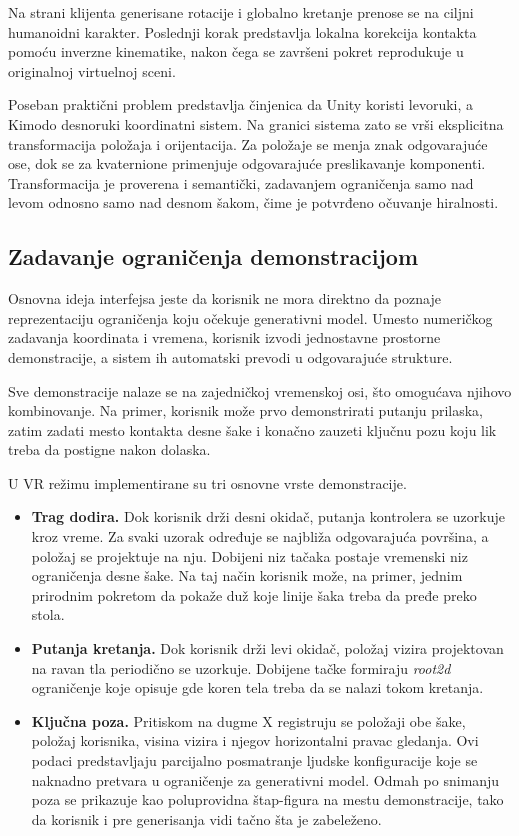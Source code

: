 \documentclass{article}
\begin{document}
Na strani klijenta generisane rotacije i globalno kretanje prenose se na ciljni humanoidni karakter. Poslednji korak predstavlja lokalna korekcija kontakta pomoću inverzne kinematike, nakon čega se završeni pokret reprodukuje u originalnoj virtuelnoj sceni.

Poseban praktični problem predstavlja činjenica da Unity koristi levoruki, a Kimodo desnoruki koordinatni sistem. Na granici sistema zato se vrši eksplicitna transformacija položaja i orijentacija. Za položaje se menja znak odgovarajuće ose, dok se za kvaternione primenjuje odgovarajuće preslikavanje komponenti. Transformacija je proverena i semantički, zadavanjem ograničenja samo nad levom odnosno samo nad desnom šakom, čime je potvrđeno očuvanje hiralnosti.

\subsection{Zadavanje ograničenja demonstracijom}
\label{sec:interactions}

Osnovna ideja interfejsa jeste da korisnik ne mora direktno da poznaje reprezentaciju ograničenja koju očekuje generativni model. Umesto numeričkog zadavanja koordinata i vremena, korisnik izvodi jednostavne prostorne demonstracije, a sistem ih automatski prevodi u odgovarajuće strukture.

Sve demonstracije nalaze se na zajedničkoj vremenskoj osi, što omogućava njihovo kombinovanje. Na primer, korisnik može prvo demonstrirati putanju prilaska, zatim zadati mesto kontakta desne šake i konačno zauzeti ključnu pozu koju lik treba da postigne nakon dolaska.

U VR režimu implementirane su tri osnovne vrste demonstracije.

\begin{itemize}
    \item \textbf{Trag dodira.} Dok korisnik drži desni okidač, putanja kontrolera se uzorkuje kroz vreme. Za svaki uzorak određuje se najbliža odgovarajuća površina, a položaj se projektuje na nju. Dobijeni niz tačaka postaje vremenski niz ograničenja desne šake. Na taj način korisnik može, na primer, jednim prirodnim pokretom da pokaže duž koje linije šaka treba da pređe preko stola.

    \item \textbf{Putanja kretanja.} Dok korisnik drži levi okidač, položaj vizira projektovan na ravan tla periodično se uzorkuje. Dobijene tačke formiraju \textit{root2d} ograničenje koje opisuje gde koren tela treba da se nalazi tokom kretanja.

    \item \textbf{Ključna poza.} Pritiskom na dugme X registruju se položaji obe šake, položaj korisnika, visina vizira i njegov horizontalni pravac gledanja. Ovi podaci predstavljaju parcijalno posmatranje ljudske konfiguracije koje se naknadno pretvara u ograničenje za generativni model. Odmah po snimanju poza se prikazuje kao poluprovidna štap-figura na mestu demonstracije, tako da korisnik i pre generisanja vidi tačno šta je zabeleženo.
\end{itemize}
\end{document}
